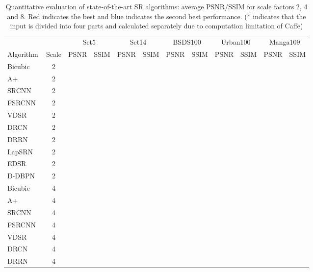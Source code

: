 \documentclass[10pt,twocolumn,letterpaper]{article}
\begin{document}
\begin{table*}[t!]
\scriptsize
\caption{Quantitative evaluation of state-of-the-art SR algorithms: average PSNR/SSIM for scale factors 2, 4 and 8. {\color{red}Red} indicates the best and {\color{blue}blue} indicates the second best performance. (* indicates that the input is divided into four parts and calculated separately due to computation limitation of Caffe)}
\centering
\label{tab:psnr}
\begin{tabular}{*1l*1c*2c*2c*2c*2c*2c}
\hline\noalign{\smallskip}
\smallskip & &\multicolumn{2}{c}{Set5} & \multicolumn{2}{c}{Set14}& \multicolumn{2}{c}{BSDS100}& \multicolumn{2}{c}{Urban100}&\multicolumn{2}{c}{Manga109} \\         
Algorithm & Scale & PSNR&SSIM & PSNR&SSIM & PSNR&SSIM & PSNR&SSIM & PSNR&SSIM  \\
\noalign{\smallskip}\hline\noalign{\smallskip}
Bicubic&2								&&&&&&&&&&\\
A+~\cite{timofte2014a+}&2					&&&&&&&&&&\\
SRCNN~\cite{dong2016image}&2			&&&&&&&&&&\\
FSRCNN~\cite{dong2016accelerating}&2		&&&&&&&&&&\\
VDSR~\cite{Kim_2016_VDSR}&2			&&&&&&&&&&\\
DRCN~\cite{kim2016deeply}&2				&&&&&&&&&&\\
DRRN~\cite{Tai-DRRN-2017}&2				&&&&&&&&&&\\
LapSRN~\cite{LapSRN}&2					&&&&&&&&&&\\
EDSR~\cite{Lim_2017_CVPR_Workshops}&2	&{\color{red}}&{\color{red}}&{\color{red}}&{\color{red}}&{\color{red}}&{\color{red}}&{\color{red}}&{\color{red}}&{\color{red}}&{\color{blue}}\\
D-DBPN &2							&{\color{blue}}&{\color{red}}&{\color{blue}}&{\color{red}}&{\color{blue}}&{\color{blue}}&{\color{blue}}&{\color{blue}}&{\color{blue}}&{\color{red}}\\
\noalign{\smallskip}\hline\noalign{\smallskip}
Bicubic&4								&&&&&&&&&&\\
A+~\cite{timofte2014a+}&4					&&&&&&&&&&\\
SRCNN~\cite{dong2016image}&4			&&&&&&&&&&\\
FSRCNN~\cite{dong2016accelerating}&4		&&&&&&&&&&\\
VDSR~\cite{Kim_2016_VDSR}&4			&&&&&&&&&&\\
DRCN~\cite{kim2016deeply}&4				&&&&&&&&&&\\
DRRN~\cite{Tai-DRRN-2017}&4				&&&&&&&&&&\\

\end{tabular}
\end{table*}
\end{document}
